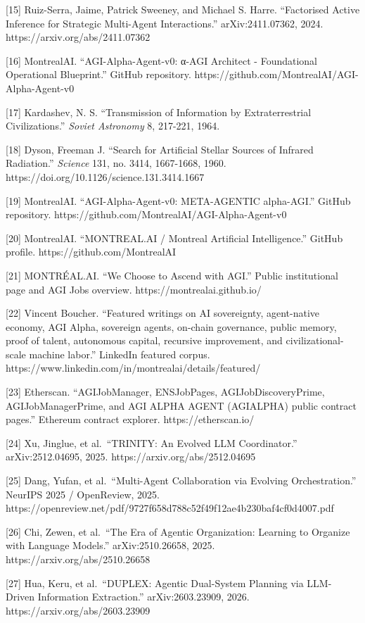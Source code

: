 \documentclass[11pt]{article}
\begin{document}
{[}15{]} Ruiz-Serra, Jaime, Patrick Sweeney, and Michael S. Harre. ``Factorised Active Inference for Strategic Multi-Agent Interactions.'' arXiv:2411.07362, 2024. https://arxiv.org/abs/2411.07362

{[}16{]} MontrealAI. ``AGI-Alpha-Agent-v0: α-AGI Architect - Foundational Operational Blueprint.'' GitHub repository. https://github.com/MontrealAI/AGI-Alpha-Agent-v0

{[}17{]} Kardashev, N. S. ``Transmission of Information by Extraterrestrial Civilizations.'' \emph{Soviet Astronomy} 8, 217-221, 1964.

{[}18{]} Dyson, Freeman J. ``Search for Artificial Stellar Sources of Infrared Radiation.'' \emph{Science} 131, no. 3414, 1667-1668, 1960. https://doi.org/10.1126/science.131.3414.1667

{[}19{]} MontrealAI. ``AGI-Alpha-Agent-v0: META-AGENTIC alpha-AGI.'' GitHub repository. https://github.com/MontrealAI/AGI-Alpha-Agent-v0

{[}20{]} MontrealAI. ``MONTREAL.AI / Montreal Artificial Intelligence.'' GitHub profile. https://github.com/MontrealAI

{[}21{]} MONTRÉAL.AI. ``We Choose to Ascend with AGI.'' Public institutional page and AGI Jobs overview. https://montrealai.github.io/

{[}22{]} Vincent Boucher. ``Featured writings on AI sovereignty, agent-native economy, AGI Alpha, sovereign agents, on-chain governance, public memory, proof of talent, autonomous capital, recursive improvement, and civilizational-scale machine labor.'' LinkedIn featured corpus. https://www.linkedin.com/in/montrealai/details/featured/

{[}23{]} Etherscan. ``AGIJobManager, ENSJobPages, AGIJobDiscoveryPrime, AGIJobManagerPrime, and AGI ALPHA AGENT (AGIALPHA) public contract pages.'' Ethereum contract explorer. https://etherscan.io/

{[}24{]} Xu, Jinglue, et al.~``TRINITY: An Evolved LLM Coordinator.'' arXiv:2512.04695, 2025. https://arxiv.org/abs/2512.04695

{[}25{]} Dang, Yufan, et al.~``Multi-Agent Collaboration via Evolving Orchestration.'' NeurIPS 2025 / OpenReview, 2025. https://openreview.net/pdf/9727f658d788c52f49f12ae4b230baf4cf0d4007.pdf

{[}26{]} Chi, Zewen, et al.~``The Era of Agentic Organization: Learning to Organize with Language Models.'' arXiv:2510.26658, 2025. https://arxiv.org/abs/2510.26658

{[}27{]} Hua, Keru, et al.~``DUPLEX: Agentic Dual-System Planning via LLM-Driven Information Extraction.'' arXiv:2603.23909, 2026. https://arxiv.org/abs/2603.23909
\end{document}
